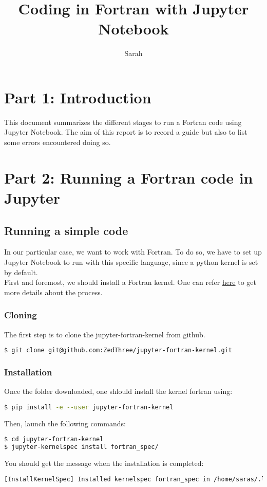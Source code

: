 \documentclass[10pt,a4paper]{article}
\author{Sarah}
\title{Coding in Fortran with Jupyter Notebook}
\begin{document}
\maketitle{}
\newpage

\section{Part 1: Introduction}
This document summarizes the different stages to run a Fortran code using Jupyter Notebook.
The aim of this report is to record a guide but also to list some errors encountered doing so.
\section{Part 2: Running a Fortran code in Jupyter}
\subsection{Running a simple code}
In our particular case, we want to work with Fortran. To do so, we have to set up Jupyter Notebook to run with this specific language, since a python kernel is set by default.\\
First and foremost, we should install a Fortran kernel. One can refer \href{https://github.com/ZedThree/jupyter-fortran-kernel}{here} to get more details about the process.\\

\subsubsection{Cloning}
\noindent The first step is to clone the jupyter-fortran-kernel from github.
\begin{lstlisting}[language=bash]
$ git clone git@github.com:ZedThree/jupyter-fortran-kernel.git
\end{lstlisting}

\subsubsection{Installation}
Once the folder downloaded, one shlould install the kernel fortran using:
\begin{lstlisting}[language=bash]
$ pip install -e --user jupyter-fortran-kernel
\end{lstlisting}

\noindent Then, launch the following commands:
\begin{lstlisting}[language=bash]
$ cd jupyter-fortran-kernel
$ jupyter-kernelspec install fortran_spec/
\end{lstlisting}
You should get the message when the installation is completed:
\begin{lstlisting}[language=bash]
[InstallKernelSpec] Installed kernelspec fortran_spec in /home/saras/.local/share/jupyter/kernels/fortran_spec
\end{lstlisting}
\end{document}
